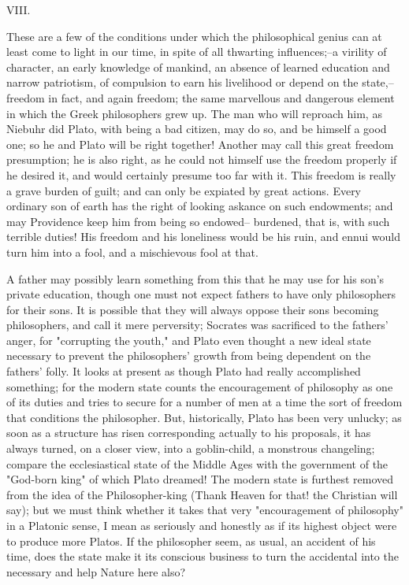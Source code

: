 VIII.

These are a few of the conditions under which the philosophical
genius can at least come to light in our time, in spite of all
thwarting influences;--a virility of character, an early knowledge of
mankind, an absence of learned education and narrow patriotism, of
compulsion to earn his livelihood or depend on the state,--freedom in
fact, and again freedom; the same marvellous and dangerous element in
which the Greek philosophers grew up. The man who will reproach him,
as Niebuhr did Plato, with being a bad citizen, may do so, and be
himself a good one; so he and Plato will be right together! Another
may call this great freedom presumption; he is also right, as he
could not himself use the freedom properly if he desired it, and
would certainly presume too far with it. This freedom is really a
grave burden of guilt; and can only be expiated by great actions.
Every ordinary son of earth has the right of looking askance on such
endowments; and may Providence keep him from being so endowed--
burdened, that is, with such terrible duties! His freedom and his
loneliness would be his ruin, and ennui would turn him into a fool,
and a mischievous fool at that.

A father may possibly learn something from this that he may use for
his son's private education, though one must not expect fathers to
have only philosophers for their sons. It is possible that they will
always oppose their sons becoming philosophers, and call it mere
perversity; Socrates was sacrificed to the fathers' anger, for
"corrupting the youth," and Plato even thought a new ideal state
necessary to prevent the philosophers' growth from being dependent on
the fathers' folly. It looks at present as though Plato had really
accomplished something; for the modern state counts the encouragement
of philosophy as one of its duties and tries to secure for a number
of men at a time the sort of freedom that conditions the philosopher.
But, historically, Plato has been very unlucky; as soon as a
structure has risen corresponding actually to his proposals, it has
always turned, on a closer view, into a goblin-child, a monstrous
changeling; compare the ecclesiastical state of the Middle Ages with
the government of the "God-born king" of which Plato dreamed! The
modern state is furthest removed from the idea of the Philosopher-king
(Thank Heaven for that! the Christian will say); but we must
think whether it takes that very "encouragement of philosophy" in a
Platonic sense, I mean as seriously and honestly as if its highest
object were to produce more Platos. If the philosopher seem, as
usual, an accident of his time, does the state make it its conscious
business to turn the accidental into the necessary and help Nature
here also?

